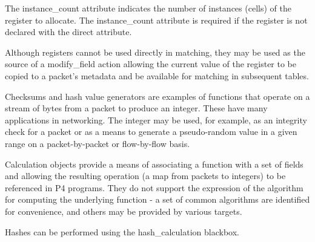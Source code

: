 \documentclass[12pt]{article}
\begin{document}
The instance_count attribute indicates the number of instances (cells) of the
register to allocate. The instance_count attribute is required if the register
is not declared with the direct attribute.

Although registers cannot be used directly in matching, they may be used as the
source of a modify_field action allowing the current value of the register to be
copied to a packet’s metadata and be available for matching in subsequent
tables.

Checksums and hash value generators are examples of functions that operate on a
stream of bytes from a packet to produce an integer. These have many
applications in networking. The integer may be used, for example, as an
integrity check for a packet or as a means to generate a pseudo-random value in
a given range on a packet-by-packet or flow-by-flow basis.

Calculation objects provide a means of associating a function with a set of
fields and allowing the resulting operation (a map from packets to integers) to
be referenced in P4 programs. They do not support the expression of the
algorithm for computing the underlying function - a set of common algorithms
are identified for convenience, and others may be provided by various targets.


Hashes can be performed using the hash_calculation blackbox. 
\end{document}

